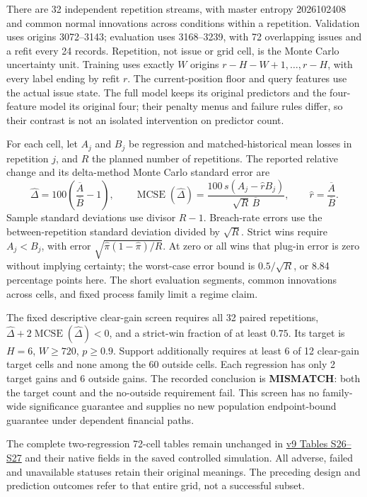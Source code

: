 \documentclass[10pt,a4paper]{article}
\begin{document}
There are 32 independent repetition streams, with master entropy 2026102408 and
common normal innovations across conditions within a repetition. Validation
uses origins 3072--3143; evaluation uses 3168--3239, with
72 overlapping issues and a refit every 24 records. Repetition, not
issue or grid cell, is the Monte Carlo uncertainty unit. Training uses exactly
\(W\) origins \(r-H-W+1,\ldots,r-H\), with every label ending by refit \(r\).
The current-position floor and query features use the actual issue state.
The full model keeps its original predictors and the four-feature model its
original four; their penalty menus and failure rules differ, so their contrast
is not an isolated intervention on predictor count.

For each cell, let \(A_j\) and \(B_j\) be regression and matched-historical mean losses in repetition \(j\), and \(R\) the planned number of repetitions. The
reported relative change and its delta-method Monte Carlo standard error are
\[
\widehat\Delta=100\left(\dfrac{\overline A}{\overline B}-1\right),\qquad
\operatorname{MCSE}(\widehat\Delta)=
\dfrac{100\,s(A_j-\widehat rB_j)}{\sqrt R\,\overline B},\qquad
\widehat r=\dfrac{\overline A}{\overline B}.
\]
Sample standard deviations use divisor \(R-1\). Breach-rate errors use the
between-repetition standard deviation divided by
\(\sqrt R\). Strict wins require \(A_j<B_j\), with error
\(\sqrt{\widehat\pi(1-\widehat\pi)/R}\). At zero or all wins that plug-in error is
zero without implying certainty; the worst-case error bound is
\(0.5/\sqrt R\), or 8.84 percentage points here. The short evaluation segments,
common innovations across cells, and fixed process family limit a regime claim.

The fixed descriptive clear-gain screen requires all 32 paired repetitions,
\(\widehat\Delta+2\operatorname{MCSE}(\widehat\Delta)<0\), and a strict-win fraction of at least \(0.75\). Its target is \(H=6\), \(W\ge 720\),
\(p\ge 0.9\). Support additionally requires at least 6 of 12
clear-gain target cells and none among the 60 outside cells. Each regression
has only 2 target gains and 6 outside gains. The recorded conclusion
is \textbf{MISMATCH}: both the target count and the no-outside requirement fail.
This screen has no family-wide significance guarantee and supplies no new
population endpoint-bound guarantee under dependent financial paths.

\begingroup
\renewcommand{\footnotesize}{\fontsize{9}{10.5}\selectfont}
The complete two-regression 72-cell tables remain unchanged in \href{https://github.com/ByronLi0207/financial-mathematics-paper-20261020/blob/0d2526cc69092c5158437a0509613bac5e86d47f/submission-jof/supplement.pdf}{v9 Tables S26--S27} and their native fields in the saved controlled simulation. All adverse, failed and unavailable statuses retain their original meanings. The preceding design and prediction outcomes refer to that entire grid, not a successful subset.
\endgroup
\end{document}
